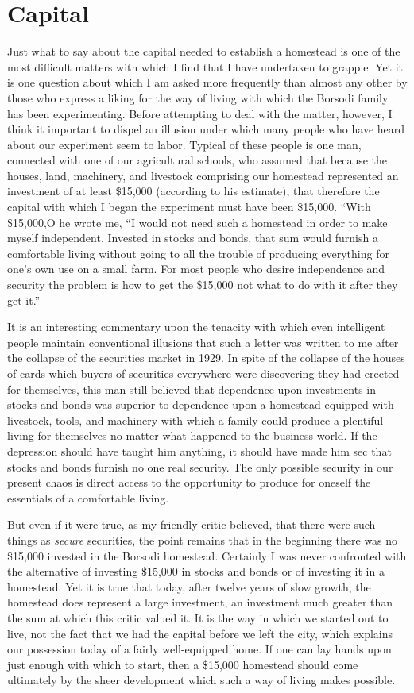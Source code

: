 \documentclass{book}
\begin{document}
\chapter{Capital}
\label{chapter-8}
Just what to say about the capital needed to establish a homestead is one of the most difficult matters with which I find that I have undertaken to grapple. Yet it is one question about which I am asked more frequently than almost any other by those who express a liking for the way of living with which the Borsodi family has been experimenting. Before attempting to deal with the matter, however, I think it important to dispel an illusion under which many people who have heard about our experiment seem to labor. Typical of these people is one man, connected with one of our agricultural schools, who assumed that because the houses, land, machinery, and livestock comprising our homestead represented an investment of at least \$15,000 (according to his estimate), that therefore the capital with which I began the experiment must have been \$15,000. “With \$15,000,O he wrote me, “I would not need such a homestead in order to make myself independent. Invested in stocks and bonds, that sum would furnish a comfortable living without going to all the trouble of producing everything for one’s own use on a small farm. For most people who desire independence and security the problem is how to get the \$15,000 not what to do with it after they get it.”

It is an interesting commentary upon the tenacity with which even intelligent people maintain conventional illusions that such a letter was written to me after the collapse of the securities market in 1929. In spite of the collapse of the houses of cards which buyers of securities everywhere were discovering they had erected for themselves, this man still believed that dependence upon investments in stocks and bonds was superior to dependence upon a homestead equipped with livestock, tools, and machinery with which a family could produce a plentiful living for themselves no matter what happened to the business world. If the depression should have taught him anything, it should have made him sec that stocks and bonds furnish no one real security. The only possible security in our present chaos is direct access to the opportunity to produce for oneself the essentials of a comfortable living.

But even if it were true, as my friendly critic believed, that there were such things as \emph{secure} securities, the point remains that in the beginning there was no \$15,000 invested in the Borsodi homestead. Certainly I was never confronted with the alternative of investing \$15,000 in stocks and bonds or of investing it in a homestead. Yet it is true that today, after twelve years of slow growth, the homestead does represent a large investment, an investment much greater than the sum at which this critic valued it. It is the way in which we started out to live, not the fact that we had the capital before we left the city, which explains our possession today of a fairly well-equipped home. If one can lay hands upon just enough with which to start, then a \$15,000 homestead should come ultimately by the sheer development which such a way of living makes possible.
\end{document}
